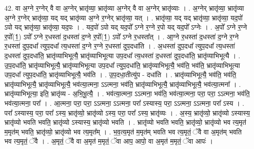 \documentclass[17pt]{extarticle}
\begin{document}
42. वा अ॒ग्ने र॒ग्नेर् वै वा अ॒ग्नेर् भ्रातृ॑व्या॒ भ्रातृ॑व्या अ॒ग्नेर् वै वा अ॒ग्नेर् भ्रातृ॑व्याः । . अ॒ग्नेर् भ्रातृ॑व्या॒ भ्रातृ॑व्या अ॒ग्ने र॒ग्नेर् भ्रातृ॑व्या॒ यद् यद् भ्रातृ॑व्या अ॒ग्ने र॒ग्नेर् भ्रातृ॑व्या॒ यत् । . भ्रातृ॑व्या॒ यद् यद् भ्रातृ॑व्या॒ भ्रातृ॑व्या॒ यद॒पो॑ ऽपो यद् भ्रातृ॑व्या॒ भ्रातृ॑व्या॒ यद॒पः । . यद॒पो॑ ऽपो यद् यद॒पो᳚ ऽग्ने र॒ग्ने र॒पो यद् यद॒पो᳚ ऽग्नेः । . अ॒पो᳚ ऽग्ने र॒ग्ने र॒पो᳚(1॒) ऽपो᳚ ऽग्ने र॒धस्ता॑ द॒धस्ता॑ द॒ग्ने र॒पो᳚(1॒) ऽपो᳚ ऽग्ने र॒धस्ता᳚त् । . आ॒ग्ने र॒धस्ता॑ द॒धस्ता॑ द॒ग्ने र॒ग्ने र॒धस्ता॑ दुप॒दधा᳚ त्युप॒दधा᳚ त्य॒धस्ता॑ द॒ग्ने र॒ग्ने र॒धस्ता॑ दुप॒दधा॑ति । . अ॒धस्ता॑ दुप॒दधा᳚ त्युप॒दधा᳚ त्य॒धस्ता॑ द॒धस्ता॑ दुप॒दधा॑ति॒ भ्रातृ॑व्याभिभूत्यै॒ भ्रातृ॑व्याभिभूत्या उप॒दधा᳚ त्य॒धस्ता॑ द॒धस्ता॑ दुप॒दधा॑ति॒ भ्रातृ॑व्याभिभूत्यै । . उ॒प॒दधा॑ति॒ भ्रातृ॑व्याभिभूत्यै॒ भ्रातृ॑व्याभिभूत्या उप॒दधा᳚ त्युप॒दधा॑ति॒ भ्रातृ॑व्याभिभूत्यै॒ भव॑ति॒ भव॑ति॒ भ्रातृ॑व्याभिभूत्या उप॒दधा᳚ त्युप॒दधा॑ति॒ भ्रातृ॑व्याभिभूत्यै॒ भव॑ति । . उ॒प॒दधा॒तीत्यु॑प - दधा॑ति । . भ्रातृ॑व्याभिभूत्यै॒ भव॑ति॒ भव॑ति॒ भ्रातृ॑व्याभिभूत्यै॒ भ्रातृ॑व्याभिभूत्यै॒ भव॑त्या॒त्मना॒ ऽऽत्मना॒ भव॑ति॒ भ्रातृ॑व्याभिभूत्यै॒ भ्रातृ॑व्याभिभूत्यै॒ भव॑त्या॒त्मना᳚ । . भ्रातृ॑व्याभिभूत्या॒ इति॒ भ्रातृ॑व्य - अ॒भि॒भू॒त्यै॒ । . भव॑त्या॒त्मना॒ ऽऽत्मना॒ भव॑ति॒ भव॑त्या॒त्मना॒ परा॒ परा॒ ऽऽत्मना॒ भव॑ति॒ भव॑त्या॒त्मना॒ परा᳚ । . आ॒त्मना॒ परा॒ परा॒ ऽऽत्मना॒ ऽऽत्मना॒ परा᳚ ऽस्यास्य॒ परा॒ ऽऽत्मना॒ ऽऽत्मना॒ परा᳚ ऽस्य । . परा᳚ ऽस्यास्य॒ परा॒ परा᳚ ऽस्य॒ भ्रातृ॑व्यो॒ भ्रातृ॑व्यो ऽस्य॒ परा॒ परा᳚ ऽस्य॒ भ्रातृ॑व्यः । . अ॒स्य॒ भ्रातृ॑व्यो॒ भ्रातृ॑व्यो ऽस्यास्य॒ भ्रातृ॑व्यो भवति भवति॒ भ्रातृ॑व्यो ऽस्यास्य॒ भ्रातृ॑व्यो भवति । . भ्रातृ॑व्यो भवति भवति॒ भ्रातृ॑व्यो॒ भ्रातृ॑व्यो भव त्य॒मृत॑ म॒मृत॑म् भवति॒ भ्रातृ॑व्यो॒ भ्रातृ॑व्यो भव त्य॒मृत᳚म् । . भ॒व॒त्य॒मृत॑ म॒मृत॑म् भवति भव त्य॒मृतं॒ ॅवै वा अ॒मृत॑म् भवति भव त्य॒मृतं॒ ॅवै । . अ॒मृतं॒ ॅवै वा अ॒मृत॑ म॒मृतं॒ ॅवा आप॒ आपो॒ वा अ॒मृत॑ म॒मृतं॒ ॅवा आपः॑ । \newline
\pagebreak
{}
\end{document}
